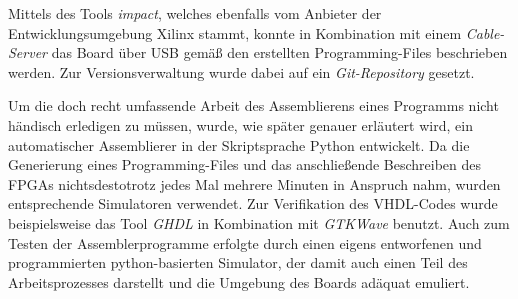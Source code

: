 Mittels des Tools \textit{impact}, welches ebenfalls vom Anbieter der
Entwicklungsumgebung Xilinx stammt, konnte in Kombination mit einem
\textit{Cable-Server} das Board \"uber USB gem\"a{\ss} den erstellten
Programming-Files beschrieben werden. Zur Versionsverwaltung wurde dabei
auf ein \textit{Git-Repository} gesetzt.

Um die doch recht umfassende Arbeit des Assemblierens eines Programms nicht
h\"andisch erledigen zu m\"ussen, wurde, wie sp\"ater genauer erl\"autert wird,
ein automatischer Assemblierer in der Skriptsprache Python entwickelt. Da die
Generierung eines Programming-Files und das anschlie\ss{}ende Beschreiben des
FPGAs nichtsdestotrotz jedes Mal mehrere Minuten in Anspruch nahm,
wurden entsprechende Simulatoren verwendet. Zur Verifikation des VHDL-Codes
wurde beispielsweise das Tool \textit{GHDL} in Kombination mit \textit{GTKWave}
benutzt. Auch zum Testen der Assemblerprogramme erfolgte durch einen eigens entworfenen und programmierten python-basierten Simulator, der damit auch einen Teil des Arbeitsprozesses darstellt und die Umgebung des Boards ad\"aquat emuliert.

\newpage